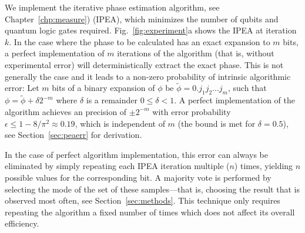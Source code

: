 \documentclass[11pt,oneside,final]{huthesis}%
\begin{document}
We implement the iterative phase estimation algorithm, see Chapter~\ref{chp:measure}) (IPEA),
which minimizes the number of qubits and quantum logic gates required. Fig.~\ref{fig:experiment}a 
shows the IPEA at iteration $k$.
In the case where the phase to be calculated has an exact expansion to $m$ bits, a perfect 
implementation of $m$ iterations of the algorithm (that is, without experimental error) will 
deterministically extract the exact phase. This is not generally the case and it leads to a 
non-zero probability of intrinsic algorithmic error: Let $m$ bits of a binary expansion of $\phi$  be 
$\tilde{\phi}=0.j_1j_2...j_{m}$, such that $\phi=\tilde{\phi}+\delta2^{-m}$ where $\delta$ is 
a remainder $0 \leq \delta < 1$. A perfect implementation of the algorithm achieves an precision 
of $\pm 2^{-m}$ with error probability $\epsilon \le 1-8/\pi^2 \approx 0.19$, 
which is independent of $m$ (the bound is met for $\delta=0.5$), see Section~\ref{sec:peaerr} for derivation. 

In the case of perfect algorithm implementation, this error can always be eliminated by simply 
repeating each IPEA iteration multiple ($n$) times, yielding $n$ possible values for the 
corresponding bit.  A majority vote is performed by selecting the mode of the set of these 
samples---that is, choosing the result that is observed most often, see Section~\ref{sec:methods}. This technique 
only requires repeating the algorithm a fixed number of times which does not affect its overall 
efficiency.
\end{document}

